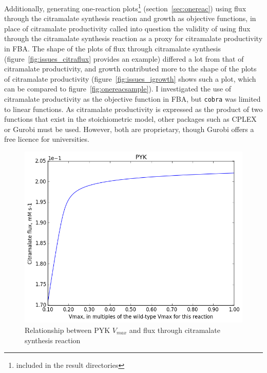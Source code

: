 \documentclass[parskip=full, numbers=noenddot]{scrreprt}
\begin{document}
Additionally, generating one-reaction plots\footnote{included in the result directories} (section~\ref{sec:onereac}) using flux through the citramalate synthesis reaction and growth as objective functions, in place of citramalate productivity called into question the validity of using flux through the citramalate synthesis reaction as a proxy for citramalate productivity in FBA. The shape of the plots of flux through citramalate synthesis (figure~\vref{fig:issues_citraflux} provides an example) differed a lot from that of citramalate productivity, and growth contributed more to the shape of the plots of citramalate productivity (figure~\vref{fig:issues_igrowth} shows such a plot, which can be compared to figure~\vref{fig:onereacsample}). I investigated the use of citramalate productivity as the objective function in FBA, but \texttt{cobra} was limited to linear functions. As citramalate productivity is expressed as the product of two functions that exist in the stoichiometric model, other packages such as CPLEX or Gurobi must be used. However, both are proprietary, though Gurobi offers a free licence for universities.

\begin{figure}[htbp]
  \centering
  \includegraphics[scale=0.4]{issues_citraflux}
  \caption{Relationship between PYK $V_{max}$ and flux through citramalate synthesis reaction}
  \label{fig:issues_citraflux}
\end{figure}
\end{document}
